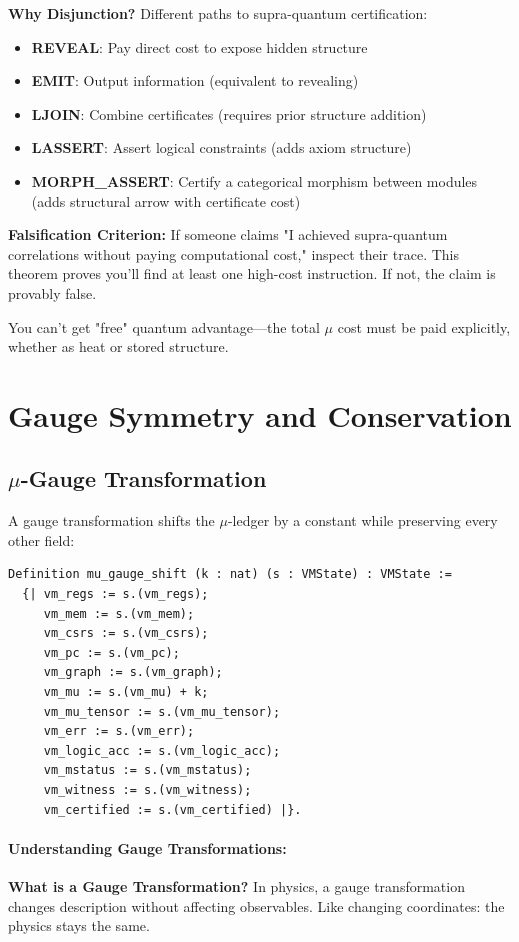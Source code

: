\textbf{Why Disjunction?} Different paths to supra-quantum certification:
\begin{itemize}
    \item \textbf{REVEAL}: Pay direct cost to expose hidden structure
    \item \textbf{EMIT}: Output information (equivalent to revealing)
    \item \textbf{LJOIN}: Combine certificates (requires prior structure addition)
    \item \textbf{LASSERT}: Assert logical constraints (adds axiom structure)
    \item \textbf{MORPH\_ASSERT}: Certify a categorical morphism between modules (adds structural arrow with certificate cost)
\end{itemize}

\textbf{Falsification Criterion:} If someone claims "I achieved supra-quantum correlations without paying computational cost," inspect their trace. This theorem proves you'll find at least one high-cost instruction. If not, the claim is provably false.

You can't get "free" quantum advantage---the total $\mu$ cost must be paid explicitly, whether as heat or stored structure.

\section{Gauge Symmetry and Conservation}

\subsection{$\mu$-Gauge Transformation}

A gauge transformation shifts the $\mu$-ledger by a constant while preserving every other field:
\begin{lstlisting}
Definition mu_gauge_shift (k : nat) (s : VMState) : VMState :=
  {| vm_regs := s.(vm_regs);
     vm_mem := s.(vm_mem);
     vm_csrs := s.(vm_csrs);
     vm_pc := s.(vm_pc);
     vm_graph := s.(vm_graph);
     vm_mu := s.(vm_mu) + k;
     vm_mu_tensor := s.(vm_mu_tensor);
     vm_err := s.(vm_err);
     vm_logic_acc := s.(vm_logic_acc);
     vm_mstatus := s.(vm_mstatus);
     vm_witness := s.(vm_witness);
     vm_certified := s.(vm_certified) |}.
\end{lstlisting}

\paragraph{Understanding Gauge Transformations:}
\textbf{What is a Gauge Transformation?} In physics, a gauge transformation changes description without affecting observables. Like changing coordinates: the physics stays the same.

